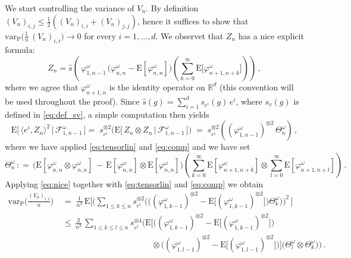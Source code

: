 \documentclass[a4paper,reqno,11pt]{amsart}
\numberwithin{equation}{section}
\newcommand{\cF}{{\ensuremath{\mathcal F}} }
\newcommand{\go}{\omega}
\newcommand{\R}{\mathbb{R}}
\def\bP{\ensuremath{\bs{\mathrm{P}}}}
\def\bE{\ensuremath{\bs{\mathrm{E}}}}
\def\bs{\boldsymbol}
\renewcommand{\phi}{\varphi}
\begin{document}
We start controlling the variance of $V_n$. By definition
$(V_n)_{i,j} \le \frac 12 ((V_n)_{i,i} + (V_n)_{j,j})$,
hence it suffices to show that
$\mathrm{var}_{\bP} \big( \frac 1n \, (V_n)_{i,i} \big) \to 0$
for every $i = 1, \ldots, d$.
We observet that $Z_n$ has a nice explicit formula:
\begin{equation}
Z_n = \hat s \left( \, \phi_{1,n-1}^\go
\, \big( \phi_{n,n}^\go - \bE [\phi_{n,n}^\go] \big)
\left( \sum_{k=0}^\infty  \bE \big[ \phi_{n+1,n+k}^\go \big] \right) \right)\,,
\end{equation}
where we agree that $\phi_{n+1,n}^\go$ is the identity operator on $\R^d$
(this convention will be used throughout the proof).
Since $\hat s(g) = \sum_{i=1}^d s_{e^i}(g) \, e^i$,
where $s_v(g)$ is defined in \eqref{eq:def_sv}, a simple computation
then yields
\begin{equation} \label{eq:nice}
	\bE\big[\, \langle e^i,Z_n\rangle^2 \,\big|\, \cF_{1,n-1}^\go \,\big]
	=\; s_{e^i}^{\otimes 2} \big(
	\bE\big[\, Z_n \otimes Z_n \,\big|\, \cF_{1,n-1}^\go \,\big] \big)
	\;=\; s_{e^i}^{\otimes 2}
	\left((\phi_{1,n-1}^\go)^{\otimes 2} \, \Theta^\go_n  \right) \,,
\end{equation}
where we have applied \eqref{eq:tensorlin} and \eqref{eq:comp} and we have set
\begin{equation}
\Theta^\go_n \,: =\,  \big( \bE[ \phi_{n,n}^\go \otimes \phi_{n,n}^\go]
  \,-\, \bE [\phi_{n,n}^\go] \otimes \bE [\phi_{n,n}^\go] \big) \left(
  \sum_{k=0}^\infty \bE[\phi_{n+1,n+k}^\go] \otimes
  \sum_{l=0}^\infty  \bE [\phi_{n+1,n+l}^\go]  \right) \,.
\end{equation}
Applying \eqref{eq:nice} together with \eqref{eq:tensorlin} and \eqref{eq:comp}
we obtain
\begin{align}
	\mathrm{var}_{\bP} \bigg( \frac{(V_n)_{i,i}}{n} \bigg)
	& \;=\; \frac{1}{n^2} \, \bE \Bigg[ \Bigg( \sum_{1 \le k \le n}
	s_{e^i}^{\otimes 2}
	\Big( \big( (\phi_{1,k-1}^\go)^{\otimes 2}
	- \bE \big[ (\phi_{1,k-1}^\go)^{\otimes 2} \big] \big) \Theta^\go_k  \Big)
	\Bigg)^2\, \Bigg] \nonumber \\
	&\;\le\, \frac{2}{n^2} \, \sum_{1 \le k \le l \le n}
	s_{e^i}^{\otimes 4} 	\Big( \bE \Big[
	\big( (\phi_{1,k-1}^\go)^{\otimes 2} - \bE \big[ (\phi_{1,k-1}^\go)^{\otimes 2} \big]
	\big) \label{eq:bestia} \\
	& \qquad \qquad \qquad \qquad \qquad \quad
	\otimes \big( (\phi_{1,l-1}^\go)^{\otimes 2} - \bE\big[ (\phi_{1,l-1}^\go)^{\otimes 2}
	\big] \big) \Big]
	\big( \Theta^\go_l \otimes \Theta^\go_k \big) \Big) \,. \nonumber
\end{align}
\end{document}
